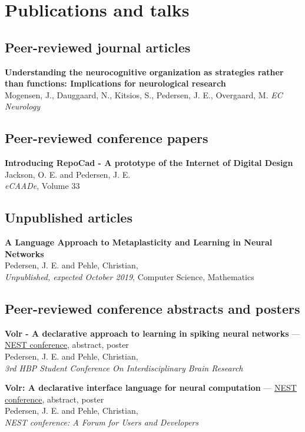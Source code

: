 \documentclass[11pt, a4paper]{article}
\newcommand{\years}[1]{\marginnote{\scriptsize #1}}
\begin{document}
\section*{Publications and talks}
\noindent

\subsection*{Peer-reviewed journal articles}
\years{2018}\textbf{Understanding the neurocognitive organization as strategies rather
than functions: Implications for neurological research}\\
Mogensen, J., Dauggaard, N., Kitsios, S., Pedersen, J. E., Overgaard, M.
\emph{EC Neurology}

\subsection*{Peer-reviewed conference papers}
\years{2015}\textbf{Introducing RepoCad - A prototype of the Internet of Digital
Design}\\
Jackson, O. E. and Pedersen, J. E.\\
\emph{eCAADe}, Volume 33

\subsection*{Unpublished articles}
\years{2019}\textbf{A Language Approach to Metaplasticity and Learning in Neural Networks} \\
Pedersen, J. E. and Pehle, Christian,\\
\emph{Unpublished, expected October 2019}, Computer Science, Mathematics

\subsection*{Peer-reviewed conference abstracts and posters}
\years{2019}\textbf{Volr - A declarative approach to learning in spiking neural networks} 
--- \href{https://education.humanbrainproject.eu/web/3rd-hbp-student-conference}{NEST
conference}, abstract, poster\\
Pedersen, J. E. and Pehle, Christian,\\
\emph{3rd HBP Student Conference On Interdisciplinary Brain Research}

\years{2018}\textbf{Volr: A declarative interface language for neural computation}
--- \href{https://indico-jsc.fz-juelich.de/event/71/}{NEST
conference}, abstract, poster\\
Pedersen, J. E. and Pehle, Christian,\\
\emph{NEST conference: A Forum for Users and Developers}
\end{document}

